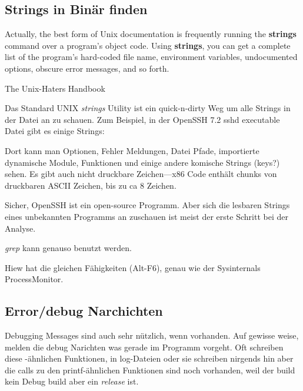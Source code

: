 \label{sec:digging_strings}



\subsection{Strings in Bin\"ar finden}

\epigraph{Actually, the best form of Unix documentation is frequently running the
\textbf{strings} command over a program’s object code. Using \textbf{strings}, you can get
a complete list of the program’s hard-coded file name, environment variables,
undocumented options, obscure error messages, and so forth.}{The Unix-Haters Handbook}

Das Standard UNIX \emph{strings} Utility ist ein quick-n-dirty Weg um alle Strings in der 
Datei an zu schauen. Zum Beispiel, in der OpenSSH 7.2 sshd executable Datei gibt es einige Strings:



Dort kann man Optionen, Fehler Meldungen, Datei Pfade, importierte dynamische Module, Funktionen und einige andere komische 
Strings (keys?) sehen. Es gibt auch nicht druckbare Zeichen---x86 Code enth\"alt chunks von druckbaren ASCII Zeichen, bis zu ca 8 Zeichen. %

Sicher, OpenSSH ist ein open-source Programm.
Aber sich die lesbaren Strings eines unbekannten Programms an zuschauen ist meist der erste Schritt bei 
der Analyse. 

\emph{grep} kann genauso benutzt werden.

Hiew hat die gleichen F\"ahigkeiten (Alt-F6), genau wie der Sysinternals ProcessMonitor.

\subsection{Error/debug Narchichten}

Debugging Messages sind auch sehr n\"utzlich, wenn vorhanden.
Auf gewisse weise, melden die debug Narichten was gerade
im Programm vorgeht. Oft schreiben diese \printf-\"ahnlichen Funktionen, in
log-Dateien oder sie schreiben nirgends hin aber die calls zu den printf-\"ahnlichen Funktionen sind noch vorhanden, 
weil der build kein Debug build aber ein \emph{release} ist. %
\myindex{\oracle}

